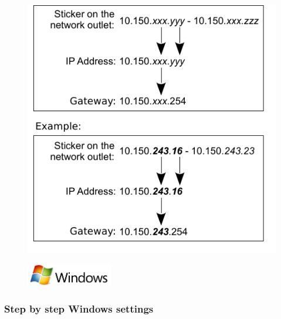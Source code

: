 \documentclass[a4paper,12pt]{scrartcl}
\begin{document}
\begin{figure}[h!]
        \centering
        \begin{minipage}[c]{0.45\linewidth}
          \centering
          \includegraphics[width=\linewidth,keepaspectratio]{Bilder/IP_Gerneric_EN}
        \end{minipage}
\end{figure}


\clearpage
\enlargethispage{20pt}

\begin{figure}[h]
    \raggedleft
    \vspace{-20pt}
    \includegraphics[height=1cm,keepaspectratio]{Bilder/Windows_logo}
    \vspace{-30pt}
\end{figure}

\subsubsection*{Step by step Windows settings}
\end{document}
